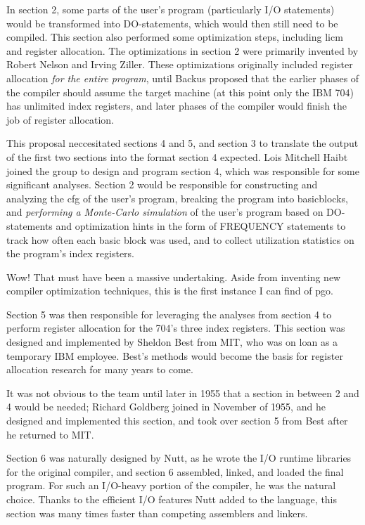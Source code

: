 In section 2, some parts of the user's program (particularly I/O statements)
would be transformed into DO-statements, which would then still need to be compiled.
This section also performed some optimization steps, including \gls{licm} and
register allocation.
The optimizations in section 2 were primarily invented by Robert Nelson and Irving Ziller.
These optimizations originally included register allocation \textit{for the entire program},
until Backus proposed that the earlier phases of the compiler should assume the
target machine (at this point only the IBM 704) has unlimited index registers,
and later phases of the compiler would finish the job of register allocation.

This proposal neccesitated sections 4 and 5, and section 3 to translate the
output of the first two sections into the format section 4 expected.
Lois Mitchell Haibt joined the group to design and program section 4,
which was responsible for some significant analyses.
Section 2 would be responsible for constructing and analyzing the \gls{cfg}
of the user's program, breaking the program into \gls{basicblock}s,
and \textit{performing a Monte-Carlo simulation} of the user's program
based on DO-statements and optimization hints in the form of FREQUENCY statements
to track how often each basic block was used, and to collect utilization
statistics on the program's index registers.

Wow! That must have been a massive undertaking.
Aside from inventing new compiler optimization techniques, this is the first
instance I can find of \gls{pgo}.

Section 5 was then responsible for leveraging the analyses from section 4
to perform register allocation for the 704's three index registers.
This section was designed and implemented by Sheldon Best from MIT,
who was on loan as a temporary IBM employee.
Best's methods would become the basis for register allocation research for many years to come.

It was not obvious to the team until later in 1955 that a section in
between 2 and 4 would be needed; Richard Goldberg joined in November of 1955,
and he designed and implemented this section,
and took over section 5 from Best after he returned to MIT.

Section 6 was naturally designed by Nutt, as he wrote the I/O runtime libraries
for the original compiler, and section 6 assembled, linked, and loaded the final program.
For such an I/O-heavy portion of the compiler, he was the natural choice.
Thanks to the efficient I/O features Nutt added to the language, this section
was many times faster than competing assemblers and linkers.

